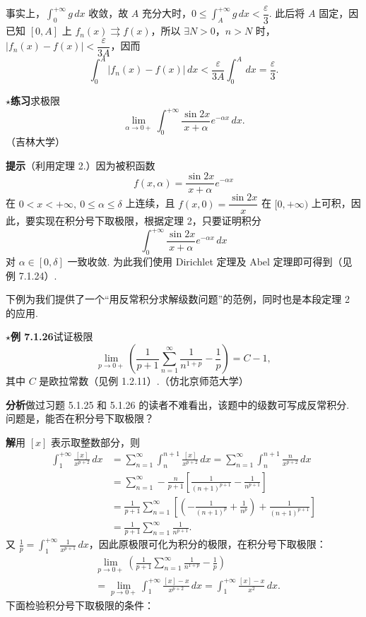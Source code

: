 \documentclass[UTF8, 12pt, fontset=fandol, oneside]{ctexart}
\begin{document}
事实上，$\displaystyle\int_0^{+\infty}g\,dx$ 收敛，故 $A$ 充分大时，$0\le\displaystyle\int_A^{+\infty}g\,dx<\dfrac{\varepsilon}{3}$. 此后将 $A$ 固定，因已知 $[0,A]$ 上 $f_n(x)\rightrightarrows f(x)$，所以 $\exists N>0$，$n>N$ 时，$|f_n(x)-f(x)|<\dfrac{\varepsilon}{3A}$，因而
\[
\int_0^A|f_n(x)-f(x)|\,dx
<\frac{\varepsilon}{3A}\int_0^A\,dx=\frac{\varepsilon}{3}.
\]

\noindent\textbf{$\star$练习}\quad 求极限
\[
\lim_{\alpha\to0+}\int_0^{+\infty}\frac{\sin2x}{x+\alpha}e^{-\alpha x}\,dx.
\]
（吉林大学）

\noindent\textbf{提示}\quad （利用定理 2.）因为被积函数
\[
f(x,\alpha)=\frac{\sin2x}{x+\alpha}e^{-\alpha x}
\]
在 $0<x<+\infty,\ 0\le\alpha\le\delta$ 上连续，且 $f(x,0)=\dfrac{\sin2x}{x}$ 在 $[0,+\infty)$ 上可积，因此，要实现在积分号下取极限，根据定理 2，只要证明积分
\[
\int_0^{+\infty}\frac{\sin2x}{x+\alpha}e^{-\alpha x}\,dx
\]
对 $\alpha\in[0,\delta]$ 一致收敛. 为此我们使用 Dirichlet 定理及 Abel 定理即可得到（见例 7.1.24）.

下例为我们提供了一个“用反常积分求解级数问题”的范例，同时也是本段定理 2 的应用.

\noindent\textbf{$\star$例 7.1.26}\quad 试证极限
\[
\lim_{p\to0+}\left(\frac1{p+1}\sum_{n=1}^{\infty}\frac1{n^{1+p}}-\frac1p\right)=C-1,
\tag{1}
\]
其中 $C$ 是欧拉常数（见例 1.2.11）.（仿北京师范大学）

\noindent\textbf{分析}\quad 做过习题 5.1.25 和 5.1.26 的读者不难看出，该题中的级数可写成反常积分. 问题是，能否在积分号下取极限？

\noindent\textbf{解}\quad 用 $[x]$ 表示取整数部分，则
\[
\begin{aligned}
\int_1^{+\infty}\frac{[x]}{x^{p+2}}\,dx
&=\sum_{n=1}^{\infty}\int_n^{n+1}\frac{[x]}{x^{p+2}}\,dx
=\sum_{n=1}^{\infty}\int_n^{n+1}\frac{n}{x^{p+2}}\,dx\\
&=\sum_{n=1}^{\infty}-\frac{n}{p+1}\left[\frac1{(n+1)^{p+1}}-\frac1{n^{p+1}}\right]\\
&=\frac1{p+1}\sum_{n=1}^{\infty}\left[\left(-\frac1{(n+1)^p}+\frac1{n^p}\right)+\frac1{(n+1)^{p+1}}\right]\\
&=\frac1{p+1}\sum_{n=1}^{\infty}\frac1{n^{p+1}}.
\end{aligned}
\]
又 $\displaystyle\frac1p=\int_1^{+\infty}\frac1{x^{p+1}}\,dx$，因此原极限可化为积分的极限，在积分号下取极限：
\begin{equation}
\begin{aligned}
&\lim_{p\to0+}\left(\frac1{p+1}\sum_{n=1}^{\infty}\frac1{n^{1+p}}-\frac1p\right)\\
&=\lim_{p\to0+}\int_1^{+\infty}\frac{[x]-x}{x^{p+2}}\,dx
=\int_1^{+\infty}\frac{[x]-x}{x^2}\,dx.
\end{aligned}
\tag{2}
\end{equation}
下面检验积分号下取极限的条件：
\end{document}
